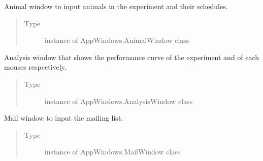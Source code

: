 \documentclass[letterpaper,10pt,english]{sphinxmanual}
\begin{document}
\begin{fulllineitems}
\begin{fulllineitems}
\begin{quote}
\begin{description}
\end{description}\end{quote}

\end{fulllineitems}


\begin{fulllineitems}
\label{\detokenize{NoSeMazeControl/main:main.MainApp.animal_window}}
\pysigstartsignatures
{}
\pysigstopsignatures
\sphinxAtStartPar
Animal window to input animals in the experiment and their schedules.
\begin{quote}\begin{description}
\item[{Type}] \leavevmode
\sphinxAtStartPar
instance of AppWindows.AnimalWindow class

\end{description}\end{quote}

\end{fulllineitems}


\begin{fulllineitems}
\label{\detokenize{NoSeMazeControl/main:main.MainApp.analysis_window}}
\pysigstartsignatures
{}
\pysigstopsignatures
\sphinxAtStartPar
Analysis window that shows the performance curve of the experiment and of
each mouses respectively.
\begin{quote}\begin{description}
\item[{Type}] \leavevmode
\sphinxAtStartPar
instance of AppWindows.AnalysisWindow class

\end{description}\end{quote}

\end{fulllineitems}


\begin{fulllineitems}
\label{\detokenize{NoSeMazeControl/main:main.MainApp.mail_window}}
\pysigstartsignatures
{}
\pysigstopsignatures
\sphinxAtStartPar
Mail window to input the mailing list.
\begin{quote}\begin{description}
\item[{Type}] \leavevmode
\sphinxAtStartPar
instance of AppWindows.MailWindow class


\end{description}
\end{quote}
\end{fulllineitems}
\end{fulllineitems}
\end{document}
